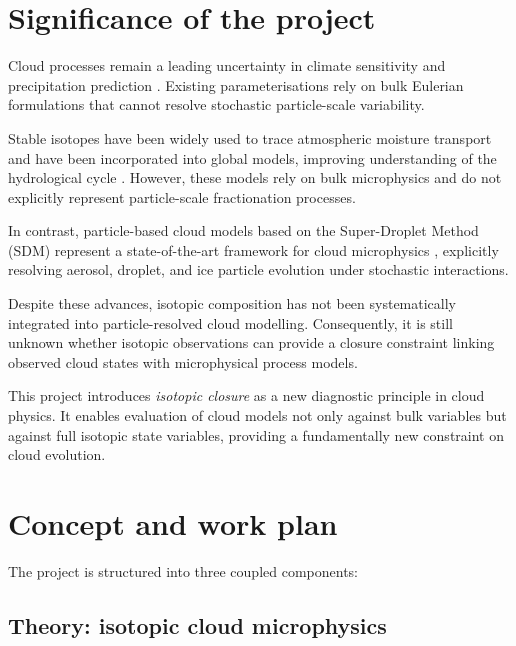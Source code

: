 \documentclass[12pt]{article}
\begin{document}
\section{Significance of the project}

Cloud processes remain a leading uncertainty in climate sensitivity and precipitation
prediction \parencite{IPCC_2023}.
Existing parameterisations rely on bulk Eulerian formulations
that cannot resolve stochastic particle-scale variability.

Stable isotopes have been widely used to trace atmospheric moisture transport and
have been incorporated into global models, improving understanding of the hydrological
cycle \parencite{2020_Risi_EtAl, 2016_Galewsky_EtAl}.
However, these models rely on bulk
microphysics and do not explicitly represent particle-scale fractionation processes.

In contrast, particle-based cloud models based on the Super-Droplet Method (SDM)
represent a state-of-the-art framework for cloud microphysics \parencite{2009_Shima_EtAl},
explicitly resolving aerosol, droplet, and ice particle evolution under stochastic
interactions.

Despite these advances, isotopic composition has not been systematically integrated
into particle-resolved cloud modelling.
Consequently, it is still unknown whether
isotopic observations can provide a closure constraint linking observed cloud states
with microphysical process models.

This project introduces \emph{isotopic closure} as a new diagnostic principle in
cloud physics. 
It enables evaluation of cloud models not only against bulk variables
but against full isotopic state variables, providing a fundamentally new constraint
on cloud evolution.

\section{Concept and work plan}

The project is structured into three coupled components:

\subsection{Theory: isotopic cloud microphysics}
\end{document}
